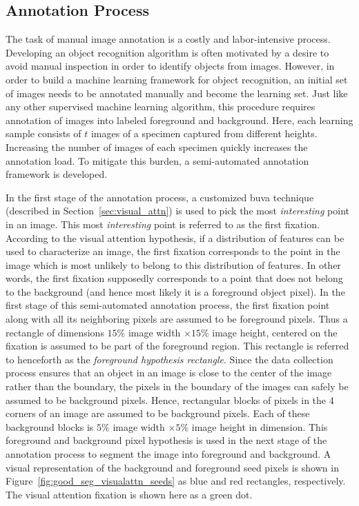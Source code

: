 \subsection{Annotation Process}
\label{sec:distdes_annotation}

The task of manual image annotation is a costly and labor-intensive process. Developing an object recognition algorithm is often motivated by a desire to avoid manual inspection in order to identify objects from images. However, in order to build a machine learning framework for object recognition, an initial set of images needs to be annotated manually and become the learning set. 
Just like any other supervised machine learning algorithm, this procedure requires annotation of images into labeled foreground and background. Here, each learning sample consists of $t$ images of a specimen captured from different heights. Increasing the number of images of each specimen quickly increases the annotation load. To mitigate this burden, a semi-automated annotation framework is developed.

In the first stage of the annotation process, a customized \gls{buva} technique (described in Section~\ref{sec:visual_attn}) is used to pick the most \textit{interesting} point in an image. This most \textit{interesting} point is referred to as the first fixation. According to the visual attention hypothesis, if a distribution of features can be used to characterize an image, the first fixation corresponds to the point in the image which is most unlikely to belong to this distribution of features. In other words, the first fixation supposedly corresponds to a point that does not belong to the background (and hence most likely it is a foreground object pixel). In the first stage of this semi-automated annotation process, the first fixation point along with all its neighboring pixels are assumed to be foreground pixels. Thus a rectangle of dimensions $15\%$ image width $\times 15\%$ image height, centered on the fixation is assumed to be part of the foreground region. This rectangle is referred to henceforth as the \textit{foreground 
hypothesis rectangle}.
Since the data collection  process ensures that an object in an image is close to the center of the image rather than the boundary, the pixels in the boundary of the images can safely be assumed to be background pixels. Hence, rectangular blocks of pixels in the 4 corners of an image are assumed to be background pixels. Each of these background blocks is $5\%$ image width $\times 5\%$ image height in dimension. This foreground and background pixel hypothesis is used in the next stage of the annotation process to segment the image into foreground and background. A visual representation of the background and foreground seed pixels is shown in Figure~\ref{fig:good_seg_visualattn_seeds} as blue and red rectangles, respectively. The visual attention fixation is shown here as a green dot.

